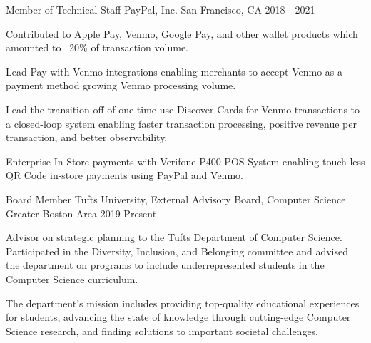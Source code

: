 
\begin{cventries}

  \cventry
    {Member of Technical Staff} %
    {PayPal, Inc.} %
    {San Francisco, CA} %
    {2018 - 2021} %
    {
      \begin{cvitems} %
        \item {Contributed to Apple Pay, Venmo, Google Pay, and other wallet products which amounted to ~20\% of transaction volume.}
        \item {Lead Pay with Venmo integrations enabling merchants to accept Venmo as a payment method growing Venmo processing volume.}
        \item {Lead the transition off of one-time use Discover Cards for Venmo transactions to a closed-loop system enabling faster transaction processing, positive revenue per transaction, and better observability.}
        \item {Enterprise In-Store payments with Verifone P400 POS System enabling touch-less QR Code in-store payments using PayPal and Venmo.}
      \end{cvitems}
    }

  \cventry
    {Board Member} %
    {Tufts University, External Advisory Board, Computer Science} %
    {Greater Boston Area} %
    {2019-Present} %
    {
      \begin{cvitems} %
      \item {Advisor on strategic planning to the Tufts Department of Computer Science. Participated in the Diversity, Inclusion, and Belonging committee and advised the department on programs to include underrepresented students in the Computer Science curriculum.}
      \item {The department's mission includes providing top-quality educational experiences for students, advancing the state of knowledge through cutting-edge Computer Science research, and finding solutions to important societal challenges.}
      \end{cvitems}
    }


\end{cventries}

